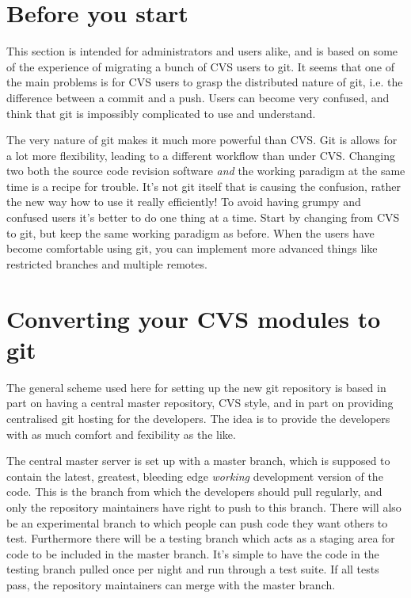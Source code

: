 \documentclass[a4paper,10pt]{article}
\begin{document}
\section{Before you start}
This section is intended for administrators and users alike, and is based on
some of the experience of migrating a bunch of CVS users to git. It seems that
one of the main problems is for CVS users to grasp the distributed nature of
git, i.e. the difference between a commit and a push. Users can become very
confused, and think that git is impossibly complicated to use and understand. 

The very nature of git makes it much more powerful than CVS. Git is allows for
a lot more flexibility, leading to a different workflow than under CVS.
Changing two both the source code revision software \emph{and} the working
paradigm at the same time is a recipe for trouble. It's not git itself that is
causing the confusion, rather the new way how to use it really efficiently! To
avoid having grumpy and confused users it's better to do one thing at a time.
Start by changing from CVS to git, but keep the same working paradigm as
before. When the users have become comfortable using git, you can implement
more advanced things like restricted branches and multiple remotes. 


\section{Converting your CVS modules to git}
The general scheme used here for setting up the new git repository is based
in part on having a central master repository, CVS style, and in
part on providing centralised git hosting for the developers. The idea is to
provide the developers with as much comfort and fexibility as the like. 

The central master server is set up with a master branch, which is supposed to
contain the latest, greatest, bleeding edge {\em working} development version
of the code. This is the branch from which the developers should pull
regularly, and only the repository maintainers have right to push to this
branch. There will also be an experimental branch to which people
can push code they want others to test. Furthermore there will be a testing
branch which acts as a staging area for code to be included in the master
branch. It's simple to have the code in the testing branch 
pulled once per night and run through a test suite. If all tests pass,
the repository maintainers can merge with the master branch. 
\end{document}
